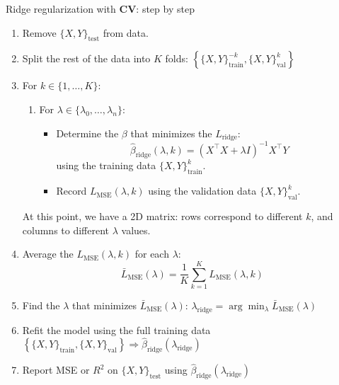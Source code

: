 \begin{frame}[allowframebreaks]{Ridge regularization with \textbf{CV}: step by step}
\begin{enumerate}
    \item Remove $\{X, Y\}_{\text{test}}$ from data.
    \item Split the rest of the data into $K$ folds:  
    $\left\{\{X, Y\}_{\text{train}}^{-k}, \{X, Y\}_{\text{val}}^k\right\}$
    
    \item For $k \in \{1, \dots, K\}$:
    \begin{enumerate}
        \item For $\lambda \in \{\lambda_0, \dots, \lambda_n\}$:
        \begin{itemize}
            \item Determine the $\beta$ that minimizes the $L_{\text{ridge}}$:
            \[
            \hat{\beta}_{\text{ridge}}(\lambda, k) = (X^\top X + \lambda I)^{-1} X^\top Y
            \]
            using the training data $\{X, Y\}_{\text{train}}^k$.
            \item Record $L_{\text{MSE}}(\lambda, k)$ using the validation data $\{X, Y\}_{\text{val}}^k$.
        \end{itemize}
    \end{enumerate}
    At this point, we have a 2D matrix: rows correspond to different $k$, and columns to different $\lambda$ values.

    \item Average the $L_{\text{MSE}}(\lambda, k)$ for each $\lambda$:
    \[
    \bar{L}_{\text{MSE}}(\lambda) = \frac{1}{K} \sum_{k=1}^{K} L_{\text{MSE}}(\lambda, k)
    \]

    \item Find the $\lambda$ that minimizes $\bar{L}_{\text{MSE}}(\lambda)$:  
    $\lambda_{\text{ridge}} = \arg\min_\lambda \bar{L}_{\text{MSE}}(\lambda)$

    \item Refit the model using the full training data  
    $\left\{\{X, Y\}_{\text{train}}, \{X, Y\}_{\text{val}}\right\} \Rightarrow \hat{\beta}_{\text{ridge}}(\lambda_{\text{ridge}})$

    \item Report MSE or $R^2$ on $\{X, Y\}_{\text{test}}$ using $\hat{\beta}_{\text{ridge}}(\lambda_{\text{ridge}})$
\end{enumerate}
\end{frame}


